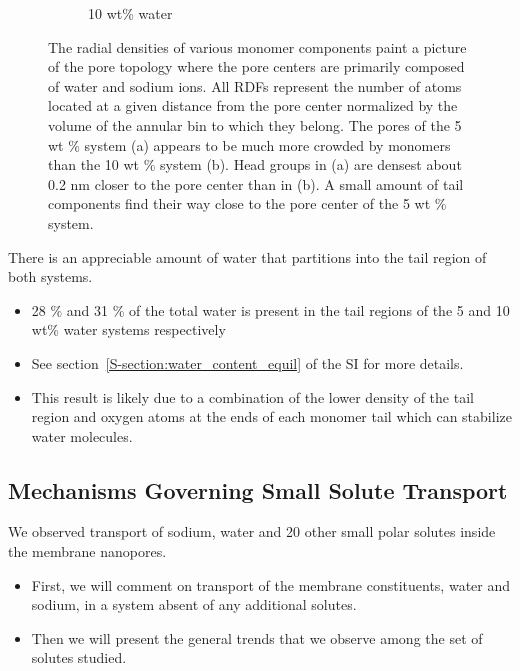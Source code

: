\documentclass{article}
\begin{document}
\begin{figure}[!htb]
\begin{subfigure}{0.415\textwidth}
  \caption{10 wt\% water}\label{fig:component_density_10wt}
  \end{subfigure}
  \caption{The radial densities of various monomer components paint a picture of the
  pore topology where the pore centers are primarily composed of water and sodium ions.
  All RDFs represent the number of atoms located at a given distance from the pore center
  normalized by the volume of the annular bin to which they belong. The pores of the 5 
  wt \% system (a) appears to be much more crowded by monomers than the 10 wt \% system (b).
  Head groups in (a) are densest about 0.2 nm closer to the pore center than in (b). 
  A small amount of tail components find their way close to the pore center of the 5 wt \% system.
  }\label{fig:component_densities}
  \end{figure}
  
  There is an appreciable amount of water that partitions into the tail region of both
  systems.
  \begin{itemize}
    \item 28 \% and 31 \% of the total water is present in the tail regions of the 5 and 
    10 wt\% water systems respectively 
    \item See section~\ref{S-section:water_content_equil} of the SI for more details.
    \item This result is likely due to a combination of the lower density of the tail region
    and oxygen atoms at the ends of each monomer tail which can stabilize water molecules. %
  \end{itemize}

  \subsection*{Mechanisms Governing Small Solute Transport}\label{section:mechanism_overview}

  We observed transport of sodium, water and 20 other small polar solutes inside the
  membrane nanopores. 
  \begin{itemize}
  	\item First, we will comment on transport of the membrane constituents, water and sodium,
  	in a system absent of any additional solutes.
    \item Then we will present the general trends that we observe among the set of 
    solutes studied.
  \end{itemize}
  
\end{document}
